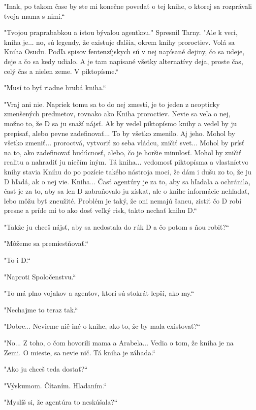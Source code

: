 \documentclass{book}
\begin{document}
"$ $Inak, po takom čase by ste mi konečne povedať o tej knihe, o ktorej sa rozprávali tvoja mama s nimi.“

"$ $Tvojou praprababkou a istou bývalou agentkou."$ $ Spresnil Tarny. "$ $Ale k veci, kniha je... no, sú legendy, že existuje ďalšia, okrem knihy proroctiev. Volá sa Kniha Osudu. Podľa spisov fentenzíjskych sú v nej napísané dejiny, čo sa udeje, deje a čo sa kedy udialo. A je tam napísané všetky alternatívy deja, proste čas, celý čas a nielen zeme. V piktopísme.“

"$ $Musí to byť riadne hrubá kniha.“

"$ $Vraj ani nie. Napriek tomu sa to do nej zmestí, je to jeden z neopticky zmenšených predmetov, rovnako ako Kniha proroctiev. Nevie sa veľa o nej, možno to, že D sa ju snaží nájsť. Ak by vedel piktopísmo knihy a vedel by ju prepísať, alebo pevne zadefinovať... To by všetko zmenilo. Aj jeho. Mohol by všetko zmeniť... proroctvá, vytvoriť zo seba vládcu, zničiť svet... Mohol by prísť na to, ako zadefinovať budúcnosť, alebo, čo je horšie minulosť. Mohol by zničiť realitu a nahradiť ju niečím iným. Tá kniha... vedomosť piktopísma a vlastníctvo knihy stavia Knihu do po pozície takého nástroja moci, že dám i dušu zo to, že ju D hľadá, ak o nej vie. Kniha... Časť agentúry je za to, aby sa hľadala a ochránila, časť je za to, aby sa len D zabraňovalo ju získať, ale o knihe informácie nehľadať, lebo môžu byť zneužité. Problém je taký, že oni nemajú šancu, zistiť čo D robí presne a príde mi to ako dosť veľký risk, takto nechať knihu D.“

"$ $Takže ju chceš nájsť, aby sa nedostala do rúk D a čo potom s ňou robiť?“

"$ $Môžeme sa premiestňovať.“

"$ $To i D.“

"$ $Naproti Spoločenstvu.“

"$ $To má plno vojakov a agentov, ktorí sú stokrát lepší, ako my.“

"$ $Nechajme to teraz tak.“

"$ $Dobre... Nevieme nič iné o knihe, ako to, že by mala existovať?“

"$ $No... Z toho, o čom hovorili mama a Arabela... Vedia o tom, že kniha je na Zemi. O mieste, sa nevie nič. Tá kniha je záhada.“

"$ $Ako ju chceš teda dostať?“

"$ $Výskumom. Čítaním. Hľadaním.“

"$ $Myslíš si, že agentúra to neskúšala?“
\end{document}
